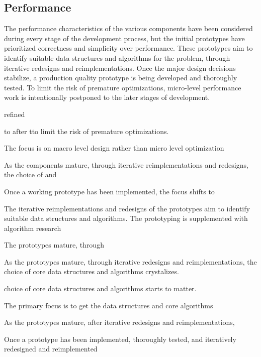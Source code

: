 
\subsection{Performance}

The performance characteristics of the various components have been considered during every stage of the development process, but the initial prototypes have prioritized correctness and simplicity over performance. These prototypes aim to identify suitable data structures and algorithms for the problem, through iterative redesigns and reimplementations. Once the major design decisions stabilize, a production quality prototype is being developed and thoroughly  tested. To limit the risk of premature optimizations, micro-level performance work is intentionally postponed to the later stages of development.

refined

 to after tto limit the risk of premature optimizations.

The focus is on macro level design rather than micro level optimization

As the components mature, through iterative reimplementations and redesigns, the choice of  and

Once a working prototype has been implemented, the focus shifts to

The iterative reimplementations and redesigns of the prototypes aim to identify suitable data structures and algorithms. The prototyping is supplemented with algorithm research


The prototypes mature, through



As the prototypes mature, through iterative redesigns and reimplementations, the choice of core data structures and algorithms crystalizes.

choice of core data structures and algorithms starts to matter.

The primary focus is to get the data structures and core algorithms

As the prototypes mature, after iterative redesigns and reimplementations,

Once a prototype has been implemented, thoroughly tested, and iteratively redesigned and reimplemented



